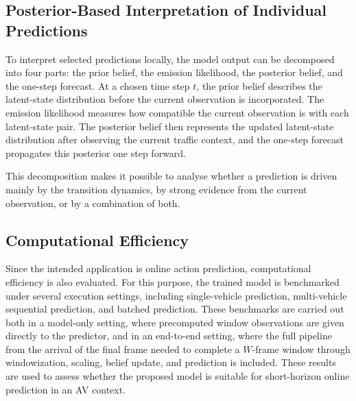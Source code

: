 \subsection{Posterior-Based Interpretation of Individual Predictions}
\label{subsec:posterior_based_interpretation}

To interpret selected predictions locally, the model output can be decomposed into four parts: the prior belief, the emission likelihood, the posterior belief, and the one-step forecast. 
At a chosen time step $t$, the prior belief describes the latent-state distribution before the current observation is incorporated. 
The emission likelihood measures how compatible the current observation is with each latent-state pair. 
The posterior belief then represents the updated latent-state distribution after observing the current traffic context, and the one-step forecast propagates this posterior one step forward.

\par This decomposition makes it possible to analyse whether a prediction is driven mainly by the transition dynamics, by strong evidence from the current observation, or by a combination of both. 

\subsection{Computational Efficiency}
\label{subsec:computational_efficiency}

Since the intended application is online action prediction, computational efficiency is also evaluated. 
For this purpose, the trained model is benchmarked under several execution settings, including single-vehicle prediction, multi-vehicle sequential prediction, and batched prediction. 
These benchmarks are carried out both in a model-only setting, where precomputed window observations are given directly to the predictor, 
and in an end-to-end setting, where the full pipeline from the arrival of the final frame needed to complete a $W$-frame window through windowization, scaling, 
belief update, and prediction is included. 
These results are used to assess whether the proposed model is suitable for short-horizon online prediction in an \ac{AV} context.

